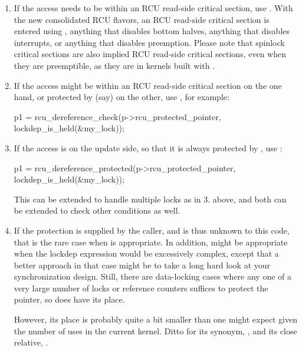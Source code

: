 \begin{enumerate}
\item	If the access needs to be within an RCU read-side critical
	section, use .
	With the new consolidated
	RCU flavors, an RCU read-side critical section is entered
	using , anything that disables bottom halves,
	anything that disables interrupts, or anything that disables
	preemption.
	Please note that spinlock critical sections
	are also implied RCU read-side critical sections, even when
	they are preemptible, as they are in kernels built with
	.

\item	If the access might be within an RCU read-side critical section
	on the one hand, or protected by (say)  on the other,
	use , for example:

\begin{VerbatimU}
		p1 = rcu_dereference_check(p->rcu_protected_pointer,
		                           lockdep_is_held(&my_lock));
\end{VerbatimU}

\item	If the access is on the update side, so that it is always protected
	by , use :

\begin{VerbatimU}
		p1 = rcu_dereference_protected(p->rcu_protected_pointer,
		                               lockdep_is_held(&my_lock));
\end{VerbatimU}

	This can be extended to handle multiple locks as in 3. above,
	and both can be extended to check other conditions as well.

\item	If the protection is supplied by the caller, and is thus unknown
	to this code, that is the rare case when 
	is appropriate.
	In addition,  might be
	appropriate when the lockdep expression would be excessively
	complex, except that a better approach in that case might be to
	take a long hard look at your synchronization design.
	Still,
	there are data-locking cases where any one of a very large number
	of locks or reference counters suffices to protect the pointer,
	so  does have its place.

	However, its place is probably quite a bit smaller than one
	might expect given the number of uses in the current kernel.
	Ditto for its synonym, , and
	its close relative, .

\end{enumerate}


